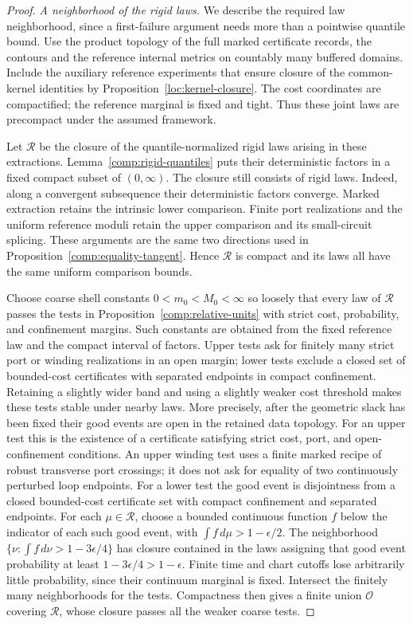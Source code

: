 \begin{proof}
\smallskip\noindent\emph{A neighborhood of the rigid laws.}
We describe the required law neighborhood, since a first-failure
argument needs more than a pointwise quantile bound.  Use the product
topology of the full marked certificate records, the contours and
the reference internal metrics on countably many buffered domains.
Include the auxiliary reference experiments that ensure closure of
the common-kernel identities by Proposition~\ref{loc:kernel-closure}.
The cost coordinates are compactified;
the reference marginal is fixed and tight.  Thus these joint laws are
precompact under the assumed framework.

Let $\mathcal R$ be the closure of the quantile-normalized rigid laws
arising in these extractions.  Lemma~\ref{comp:rigid-quantiles} puts
their deterministic factors in a fixed compact subset of $(0,\infty)$.
The closure still consists of rigid laws.  Indeed, along a convergent
subsequence their deterministic factors converge.  Marked extraction
retains the intrinsic lower comparison.  Finite port realizations and
the uniform reference moduli retain the upper comparison and its
small-circuit splicing.  These arguments are the same two directions
used in Proposition~\ref{comp:equality-tangent}.  Hence $\mathcal R$
is compact and its laws all have the same uniform comparison bounds.

Choose coarse shell constants $0<m_0<M_0<\infty$ so loosely that every
law of $\mathcal R$ passes the tests in
Proposition~\ref{comp:relative-units} with strict cost, probability,
and confinement margins.  Such constants are obtained from the fixed
reference law and the compact interval of factors.  Upper tests ask
for finitely many strict port or winding realizations in an open
margin; lower tests exclude a closed set of bounded-cost certificates
with separated endpoints in compact confinement.  Retaining a
slightly wider band and using a slightly weaker cost threshold makes
these tests stable under nearby laws.  More precisely, after the
geometric slack has been fixed their good events are open in the
retained data topology.  For an upper test this is the existence of
a certificate satisfying strict cost, port, and open-confinement
conditions.  An upper winding test uses a finite marked recipe of
robust transverse port crossings; it does not ask for equality of
two continuously perturbed loop endpoints.  For a lower test the
good event is disjointness from a closed
bounded-cost certificate set with compact confinement and separated
endpoints.  For each $\mu\in\mathcal R$, choose a bounded continuous
function $f$ below the indicator of each such good event, with
$\int f\,d\mu>1-\epsilon/2$.  The neighborhood
$\{\nu:\int f\,d\nu>1-3\epsilon/4\}$ has closure contained in
the laws assigning that good event probability at least
$1-3\epsilon/4>1-\epsilon$.  Finite time and chart cutoffs lose
arbitrarily little probability, since their continuum marginal
is fixed.  Intersect the finitely many neighborhoods for the tests.
Compactness then gives a finite union $\mathcal O$ covering
$\mathcal R$, whose closure passes all the weaker coarse tests.


\end{proof}
